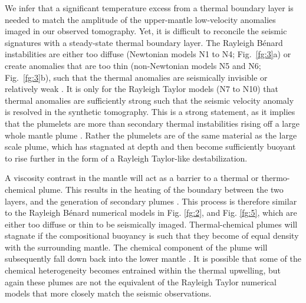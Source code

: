 \documentclass[a4paper,10pt,twocolumn]{paper}
\begin{document}
We infer that a significant temperature excess from a thermal boundary layer is needed to match the amplitude of the upper-mantle low-velocity anomalies imaged in our observed tomography. Yet, it is difficult to reconcile the seismic signatures with a steady-state thermal boundary layer. The Rayleigh B{\'e}nard instabilities are either too diffuse (Newtonian models N1 to N4; Fig.~\ref{fg:3}a) or create anomalies that are too thin (non-Newtonian models N5 and N6; Fig.~\ref{fg:3}b), such that the thermal anomalies are seismically invisible or relatively weak \citep[e.g.][]{goes-etal-2004}. It is only for the Rayleigh Taylor models (N7 to N10) that thermal anomalies are sufficiently strong such that the seismic velocity anomaly is resolved in the synthetic tomography. This is a strong statement, as it implies that the plumelets are more than secondary thermal instabilities rising off a large whole mantle plume \citep[e.g.][]{kumagai-etal-2007,kumagai-etal-2008}. Rather the plumelets are of the same material as the large scale plume, which has stagnated at depth and then become sufficiently buoyant to rise further in the form of a Rayleigh Taylor-like destabilization.

A viscosity contrast in the mantle will act as a barrier to a thermal or thermo-chemical plume. This results in the heating of the boundary between the two layers, and the generation of secondary plumes \citep{kumagai-etal-2007}. This process is therefore similar to the Rayleigh B{\'e}nard numerical models in Fig. \ref{fg:2}, and Fig. \ref{fg:5}, which are either too diffuse or thin to be seismically imaged. Thermal-chemical plumes will stagnate if the compositional buoyancy is such that they become of equal density with the surrounding mantle. The chemical component of the plume will subsequently fall down back into the lower mantle \citep{kumagai-etal-2008}. It is possible that some of the chemical heterogeneity becomes entrained within the thermal upwelling, but again these plumes are not the equivalent of the Rayleigh Taylor numerical models that more closely match the seismic observations.
\end{document}
